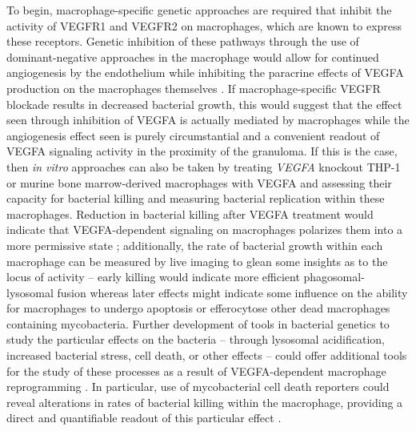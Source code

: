 To begin, macrophage\hyp{}specific genetic approaches are required that inhibit the activity of VEGFR1 and VEGFR2 on macrophages, which are known to express these receptors. Genetic inhibition of these pathways through the use of dominant\hyp{}negative approaches in the macrophage would allow for continued angiogenesis by the endothelium while inhibiting the paracrine effects of VEGFA production on the macrophages themselves \citep{Stratmann2001, Tsou2002}. If macrophage\hyp{}specific VEGFR blockade results in decreased bacterial growth, this would suggest that the effect seen through inhibition of VEGFA is actually mediated by macrophages while the angiogenesis effect seen is purely circumstantial and a convenient readout of VEGFA signaling activity in the proximity of the granuloma. If this is the case, then \textit{in vitro} approaches can also be taken by treating \textit{VEGFA} knockout THP\hyp{}1 or murine bone marrow\hyp{}derived macrophages with VEGFA and assessing their capacity for bacterial killing and measuring bacterial replication within these macrophages. Reduction in bacterial killing after VEGFA treatment would indicate that VEGFA\hyp{}dependent signaling on macrophages polarizes them into a more permissive state \citep{Murakami2006, Murakami2008, Dineen2008, Lai2019, Okikawa2022}; additionally, the rate of bacterial growth within each macrophage can be measured by live imaging to glean some insights as to the locus of activity -- early killing would indicate more efficient phagosomal\hyp{}lysosomal fusion whereas later effects might indicate some influence on the ability for macrophages to undergo apoptosis or efferocytose other dead macrophages containing mycobacteria. Further development of tools in bacterial genetics to study the particular effects on the bacteria -- through lysosomal acidification, increased bacterial stress, cell death, or other effects -- could offer additional tools for the study of these processes as a result of VEGFA\hyp{}dependent macrophage reprogramming \citep{McCann2007, Carroll2010, Abramovitch2011, Simeone2012, Tan2013, Sukumar2014, Abramovitch2018, Hayashi2018}. In particular, use of mycobacterial cell death reporters could reveal alterations in rates of bacterial killing within the macrophage, providing a direct and quantifiable readout of this particular effect \citep{Nkwouano2017, MacGilvary2018}. 

